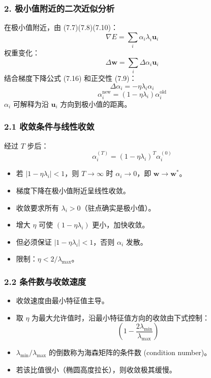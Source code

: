 \documentclass[t,aspectratio=169]{beamer} %
\begin{document}
\begin{frame}
    \frametitle{2. 极小值附近的二次近似分析}
    在极小值附近，由 (7.7)(7.8)(7.10)：
    \begin{equation}
    \nabla E = \sum_i \alpha_i \lambda_i \mathbf{u}_i
    \tag{7.24}
    \end{equation}
    权重变化：
    \begin{equation}
    \Delta \mathbf{w} = \sum_i \Delta \alpha_i \mathbf{u}_i
    \tag{7.25}
    \end{equation}
    结合梯度下降公式 (7.16) 和正交性 (7.9)：
    \begin{equation}
    \Delta \alpha_i = -\eta \lambda_i \alpha_i
    \tag{7.26}
    \end{equation}
    \begin{equation}
    \alpha_i^{\mathrm{new}} = (1 - \eta \lambda_i) \alpha_i^{\mathrm{old}}
    \tag{7.27}
    \end{equation}
    $\alpha_i$ 可解释为\alert{沿 $\mathbf{u}_i$ 方向到极小值的距离}。
\end{frame}

\begin{frame}
    \frametitle{2.1 收敛条件与线性收敛}
    经过 $T$ 步后：
    \begin{equation}
    \alpha_i^{(T)} = (1 - \eta \lambda_i)^T \alpha_i^{(0)}
    \tag{7.29}
    \end{equation}
    \begin{itemize}
        \item 若 $|1 - \eta \lambda_i| < 1$，则 $T \to \infty$ 时 $\alpha_i \to 0$，即 $\mathbf{w} \to \mathbf{w}^*$。
        \item 梯度下降在极小值附近呈\alert{线性收敛}。
        \item 收敛要求所有 $\lambda_i > 0$（驻点确实是极小值）。
        \item 增大 $\eta$ 可使 $(1 - \eta \lambda_i)$ 更小，加快收敛。
        \item 但必须保证 $|1 - \eta \lambda_i| < 1$，否则 $\alpha_i$ 发散。
        \item 限制：\alert{$\eta < 2 / \lambda_{\max}$}。
    \end{itemize}
\end{frame}

\begin{frame}
    \frametitle{2.2 条件数与收敛速度}
    \begin{itemize}
        \item 收敛速度由\alert{最小特征值}主导。
        \item 取 $\eta$ 为最大允许值时，沿最小特征值方向的收敛由下式控制：
        \begin{equation}
        \left(1 - \frac{2 \lambda_{\min}}{\lambda_{\max}}\right)
        \tag{7.30}
        \end{equation}
        \item $\lambda_{\min} / \lambda_{\max}$ 的倒数称为海森矩阵的\alert{条件数 (condition number)}。
        \item 若该比值很小（椭圆高度拉长），则收敛\alert{极其缓慢}。
    \end{itemize}
\end{frame}
\end{document}

